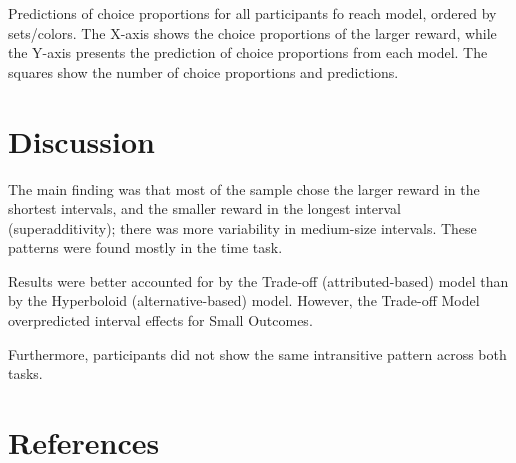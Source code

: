 \documentclass[jou,apacite]{apa6}
\begin{document}
Predictions of choice proportions for all participants fo reach model, ordered by sets/colors. The X-axis shows the choice proportions of the larger reward, while the Y-axis presents the prediction of choice proportions from each model. The squares show the number of choice proportions and predictions. 

\section{Discussion}
The main finding was that most of the sample chose the larger reward in the shortest intervals, and the smaller reward in the longest interval (superadditivity); there was more variability in medium-size intervals. These patterns were found mostly in the time task.

Results were better accounted for by the Trade-off (attributed-based) model than by the Hyperboloid (alternative-based) model. However, the Trade-off Model overpredicted interval effects for Small Outcomes. 

Furthermore, participants did not show the same intransitive pattern across both tasks. 

\section{References}
\end{document}
